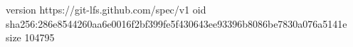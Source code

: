 version https://git-lfs.github.com/spec/v1
oid sha256:286e8544260aa6e0016f2bf399fe5f430643ee93396b8086be7830a076a5141e
size 104795
